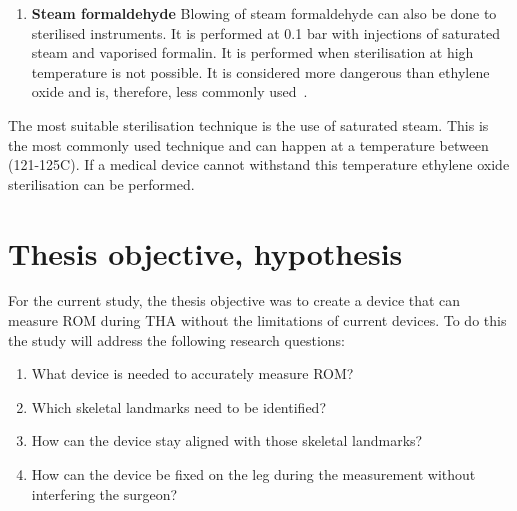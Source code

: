 \documentclass[whitelogo]{tudelft-report}
\begin{document}
{\begin{enumerate}
	\item \textbf{Steam formaldehyde} Blowing of steam formaldehyde can also be done to sterilised instruments. It is performed at 0.1 bar with injections of saturated steam and vaporised formalin. It is performed when sterilisation at high temperature is not possible. It is considered more dangerous than ethylene oxide and is, therefore, less commonly used~\cite{tessarolo2008sterilization}\cite{WinNT}. %
\end{enumerate}
The most suitable sterilisation technique is the use of saturated steam. This is the most commonly used technique and can happen at a temperature between (121-125\degree C). If a medical device cannot withstand this temperature ethylene oxide sterilisation can be performed. 

\section{Thesis objective, hypothesis}
For the current study, the thesis objective was to create a device that can measure ROM during THA without the limitations of current devices. To do this the study will address the following research questions:
\begin{enumerate}
	\item What device is needed to accurately measure ROM?
	\item Which skeletal landmarks need to be identified?
	\item How can the device stay aligned with those skeletal landmarks? 
	\item How can the device be fixed on the leg during the measurement without interfering the surgeon?
\end{enumerate}

}
\end{document}
